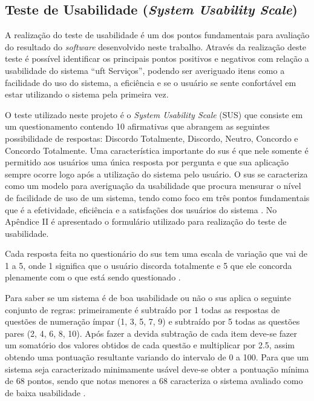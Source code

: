 \subsection*{Teste de Usabilidade (\textit{System Usability Scale})}

\noindent A realização do teste de usabilidade é um dos pontos fundamentais para avaliação do resultado do \textit{software} desenvolvido neste trabalho. Através da realização deste teste é possível identificar os principais pontos positivos e negativos com relação a usabilidade do sistema ``\acrshort{uft} Serviços'', podendo ser averiguado itens como a facilidade do uso do sistema, a eficiência e se o usuário se sente confortável em estar utilizando o sistema pela primeira vez.

O teste utilizado neste projeto é o \textit{System Usability Scale} (SUS) que consiste em um questionamento contendo 10 afirmativas que abrangem as seguintes possibilidade de respostas: Discordo Totalmente, Discordo, Neutro, Concordo e Concordo Totalmente. Uma característica importante do  \acrshort{sus} é que nele somente é permitido aos usuários uma única resposta por pergunta e que sua aplicação sempre ocorre logo após a utilização do sistema pelo usuário. O \acrshort{sus} se caracteriza como um modelo para averiguação da usabilidade que procura mensurar o nível de facilidade de uso de um sistema, tendo como foco em três pontos fundamentais que é a efetividade, eficiência e a satisfações dos usuários do sistema \cite{bangor2009determining}. No Apêndice II é apresentado o formulário utilizado para realização do teste de usabilidade.

Cada resposta feita no questionário do \acrshort{sus} tem uma escala de variação que vai de 1 a 5, onde 1 significa que o usuário discorda totalmente e 5 que ele concorda plenamente com o que está sendo questionado \cite{bangor2009determining}. 

Para saber se um sistema é de boa usabilidade ou não o \acrshort{sus} aplica o seguinte conjunto de regras: primeiramente é subtraído por 1 todas as respostas de questões de numeração ímpar (1, 3, 5, 7, 9) e subtraído por 5 todas as questões pares (2, 4, 6, 8, 10). Após fazer a devida subtração de cada item deve-se fazer um somatório dos valores obtidos de cada questão e multiplicar por 2.5, assim obtendo uma pontuação resultante variando do intervalo de 0 a 100. Para que um sistema seja caracterizado minimamente usável deve-se obter a pontuação mínima de 68 pontos, sendo que notas menores a 68 caracteriza o sistema avaliado como de baixa usabilidade \cite{Brooke:2013:SR:2817912.2817913}.

